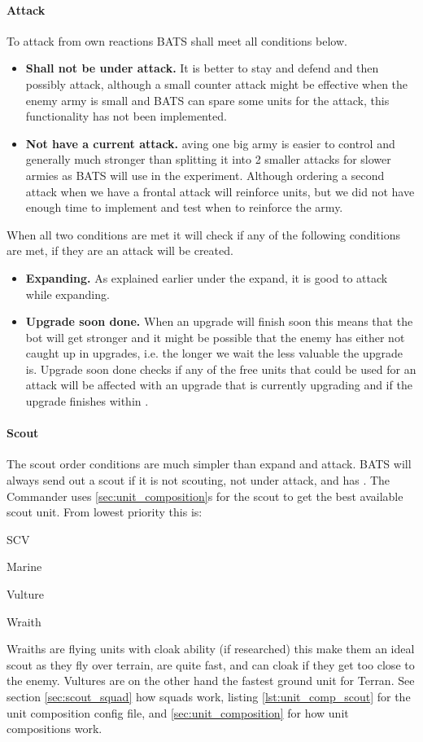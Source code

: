 \paragraph{Attack}
To attack from own reactions BATS shall meet all conditions below.
\begin{itemize}
  \item \textbf{Shall not be under attack.} It is better to stay and defend and then possibly
	attack, although a small counter attack might be effective when the enemy army is small and BATS
	can spare some units for the attack, this functionality has not been implemented.
  \item \textbf{Not have a current attack.} aving one big army is easier to control and generally
	much stronger than splitting it into 2 smaller attacks for slower armies\cite{day9} as BATS will
	use in the experiment. Although ordering a second attack when we have a frontal attack will
	reinforce units, but we did not have enough time to implement and test when to reinforce the
	army.
\end{itemize}
When all two conditions are met it will check if any of the following conditions are met, if they
are an attack will be created.
\begin{itemize}
	\item \textbf{Expanding.} As explained earlier under the expand, it is good to attack while
		expanding.
	\item \textbf{Upgrade soon done.} When an upgrade will finish soon this means that the bot will
		get stronger and it might be possible that the enemy has either not caught up in upgrades, i.e.
		the longer we wait the less valuable the upgrade is\cite{day9}. Upgrade soon done checks if any
		of the free units that could be used for an attack will be affected with an upgrade that is
		currently upgrading and if the upgrade finishes within \classificationUpgradeSoonDone.
\end{itemize}

\paragraph{Scout}
The scout order conditions are much simpler than expand and attack. BATS will always send out a
scout if it is not scouting, not under attack, and has \CommanderScoutOnWorkerCount. The Commander
uses \ref{sec:unit_composition}s for the scout to get the best available scout unit. From lowest
priority this is:
\vspace{0.5em}
\begin{compactenum}
  \item SCV
	\item Marine
	\item Vulture
	\item Wraith
\end{compactenum}
Wraiths are flying units with cloak ability (if researched) this make them an ideal scout as they
fly over terrain, are quite fast, and can cloak if they get too close to the enemy. Vultures are on
the other hand the fastest ground unit for Terran. See section \ref{sec:scout_squad} how squads
work, listing \ref{lst:unit_comp_scout} for the unit composition config file, and
\ref{sec:unit_composition} for how unit compositions work.


